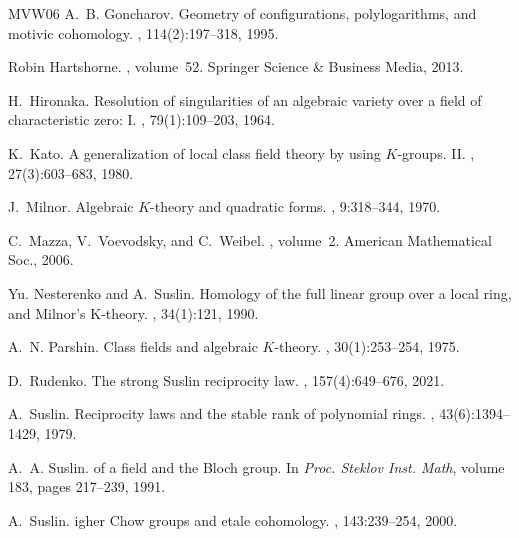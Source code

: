 \documentclass[12pt]{extarticle}
\begin{document}
\begin{thebibliography}{MVW06}
A.~B. Goncharov.
\newblock Geometry of configurations, polylogarithms, and motivic cohomology.
, 114(2):197--318, 1995.

Robin Hartshorne.
, volume~52.
\newblock Springer Science \& Business Media, 2013.

H.~Hironaka.
\newblock Resolution of singularities of an algebraic variety over a field of characteristic zero: I.
, 79(1):109–203, 1964.

K.~Kato.
\newblock A generalization of local class field theory by using {$K $}-groups. {II}.
, 27(3):603--683, 1980.

J.~Milnor.
\newblock Algebraic {$K$}-{t}heory and quadratic forms.
, 9:318--344, 1970.

C.~Mazza, V.~Voevodsky, and C.~Weibel.
, volume~2.
\newblock American Mathematical Soc., 2006.

Yu. Nesterenko and A.~Suslin.
\newblock Homology of the full linear group over a local ring, and {M}ilnor's {K}-theory.
, 34(1):121, 1990.

A.~N. Parshin.
\newblock Class fields and algebraic {$K$}-theory.
, 30(1):253--254, 1975.

D.~Rudenko.
\newblock The strong {S}uslin reciprocity law.
, 157(4):649--676, 2021.

A.~Suslin.
\newblock Reciprocity laws and the stable rank of polynomial rings.
, 43(6):1394--1429, 1979.

A.~A. Suslin.
 of a field and the {B}loch group.
\newblock In {\em Proc. Steklov Inst. Math}, volume 183, pages 217--239, 1991.

A.~Suslin.
igher {C}how groups and etale cohomology.
, 143:239--254, 2000.


\end{thebibliography}
\end{document}
